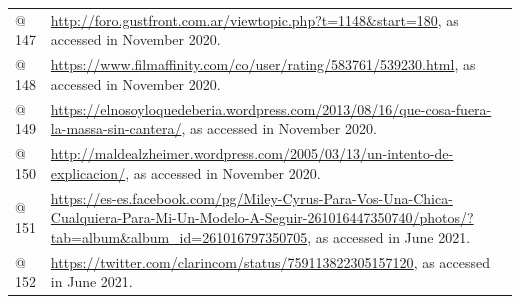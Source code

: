 \begin{flushleft}
\begin{supertabular}{m{0.7955598in}m{5.35876in}}
@ 147  &
\url{http://foro.gustfront.com.ar/viewtopic.php?t=1148&start=180}, as accessed in November 2020.\\
@ 148  &
\url{https://www.filmaffinity.com/co/user/rating/583761/539230.html}, as accessed in November 2020.\\
@ 149  &
\url{https://elnosoyloquedeberia.wordpress.com/2013/08/16/que-cosa-fuera-la-massa-sin-cantera/}, as accessed in November 2020.\\
@ 150  &
\url{http://maldealzheimer.wordpress.com/2005/03/13/un-intento-de-explicacion/}, as accessed in November 2020.\\
@ 151 &
\url{https://es-es.facebook.com/pg/Miley-Cyrus-Para-Vos-Una-Chica-Cualquiera-Para-Mi-Un-Modelo-A-Seguir-261016447350740/photos/?tab=album&album_id=261016797350705}, as accessed in June 2021.\\
@ 152 &
\url{https://twitter.com/clarincom/status/759113822305157120}, as accessed in June 2021.\\
\end{supertabular}
\end{flushleft}
